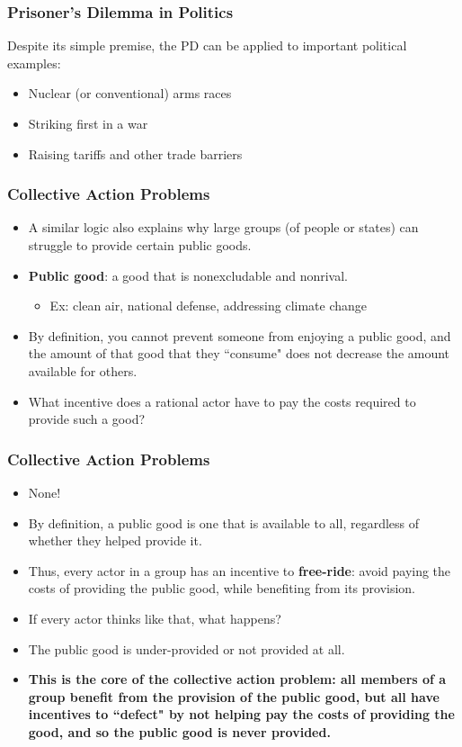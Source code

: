 \documentclass{beamer}
\begin{document}
\begin{frame} 
	\frametitle{\LARGE{Prisoner's Dilemma in Politics}}
	Despite its simple premise, the PD can be applied to important political examples:
	\begin{itemize}
		\item Nuclear (or conventional) arms races \pause
		\item Striking first in a war \pause
		\item Raising tariffs and other trade barriers 
	\end{itemize}
\end{frame}

\begin{frame} 
	\frametitle{\LARGE{Collective Action Problems}}
	\begin{itemize}
		\item A similar logic also explains why large groups (of people or states) can struggle to provide certain public goods. \pause
		\item \textbf{Public good}: a good that is nonexcludable and nonrival.
		\begin{itemize}
			\item Ex: clean air, national defense, addressing climate change \pause
		\end{itemize} 
		\item By definition, you cannot prevent someone from enjoying a public good, and the amount of that good that they ``consume" does not decrease the amount available for others. \pause
		\item What incentive does a rational actor have to pay the costs required to provide such a good?
	\end{itemize}
\end{frame}

\begin{frame} 
	\frametitle{\LARGE{Collective Action Problems}}
	\begin{itemize}
		\item None! \pause
		\item By definition, a public good is one that is available to all, regardless of whether they helped provide it. \pause
		\item Thus, every actor in a group has an incentive to \textbf{free-ride}: avoid paying the costs of providing the public good, while benefiting from its provision. \pause
		\item If every actor thinks like that, what happens? \pause
		\item The public good is under-provided or not provided at all. \pause
		\item \textbf{This is the core of the collective action problem: all members of a group benefit from the provision of the public good, but all have incentives to ``defect" by not helping pay the costs of providing the good, and so the public good is never provided.}
	\end{itemize}
\end{frame}
\end{document}
